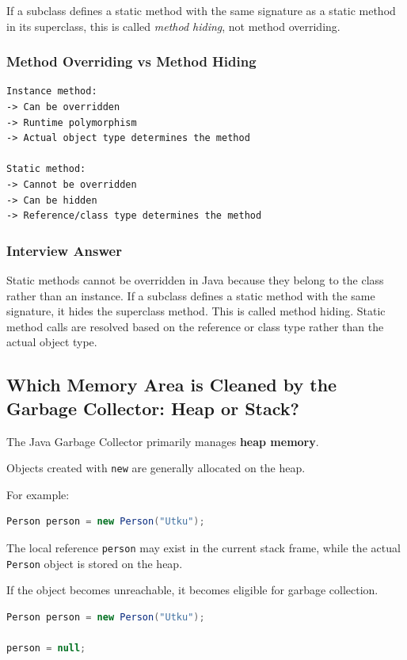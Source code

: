 \documentclass[12pt,a4paper]{article}
\begin{document}
If a subclass defines a static method with the same signature as a static
method in its superclass, this is called \textit{method hiding}, not method
overriding.

\subsubsection*{Method Overriding vs Method Hiding}

\begin{verbatim}
Instance method:
-> Can be overridden
-> Runtime polymorphism
-> Actual object type determines the method

Static method:
-> Cannot be overridden
-> Can be hidden
-> Reference/class type determines the method
\end{verbatim}

\subsubsection*{Interview Answer}

Static methods cannot be overridden in Java because they belong to the
class rather than an instance. If a subclass defines a static method with
the same signature, it hides the superclass method. This is called method
hiding. Static method calls are resolved based on the reference or class
type rather than the actual object type.

\subsection{Which Memory Area is Cleaned by the Garbage Collector: Heap or Stack?}

The Java Garbage Collector primarily manages \textbf{heap memory}.

Objects created with \texttt{new} are generally allocated on the heap.

For example:

\begin{lstlisting}[language=Java]
Person person = new Person("Utku");
\end{lstlisting}

The local reference \texttt{person} may exist in the current stack frame,
while the actual \texttt{Person} object is stored on the heap.

If the object becomes unreachable, it becomes eligible for garbage
collection.

\begin{lstlisting}[language=Java]
Person person = new Person("Utku");

person = null;
\end{lstlisting}
\end{document}

